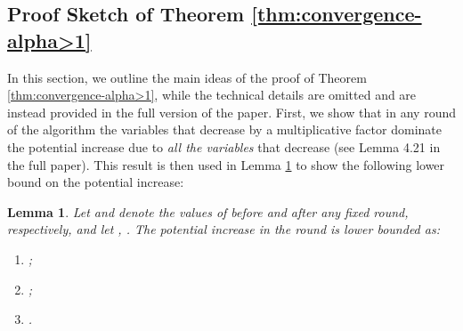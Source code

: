 \documentclass[11pt]{article}
\newtheorem{lemma}[theorem]{Lemma}
\begin{document}
\else
\subsection{Proof Sketch of Theorem \ref{thm:convergence-alpha>1}}\label{section:alpha>1}

In this section, we outline the main ideas of the proof of Theorem \ref{thm:convergence-alpha>1}, while the technical details are omitted and are instead provided in the {full version of the paper}. 
First, we show that in any round of the algorithm the variables that decrease by a multiplicative factor  dominate the potential increase due to \emph{all the variables} that decrease (see Lemma {4.21} in the full paper). 
This result is then used in Lemma \ref{lemma:potential-increase-alpha>1} to show the following lower bound on the potential increase:



\begin{lemma}\label{lemma:potential-increase-alpha>1}
Let  and  denote the values of  before and after any fixed round, respectively, and let , . The potential increase in the round is lower bounded as:
\begin{enumerate}[noitemsep, topsep=5pt]
\item ;
\item ;
\item .
\end{enumerate}
\end{lemma}
\end{document}
